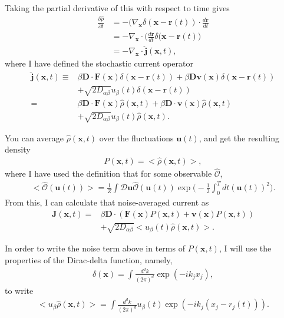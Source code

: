 \documentclass[twocolumn,amsmath,amssymb,aps]{revtex4-1}%
\begin{document}
Taking the partial derivative of this with respect to time gives
\begin{align}
  \frac{\partial\hat{\rho}}{\partial t}
  &=-(\nabla_{\bm{x}}\delta(\bm{x}-\bm{r}(t))
  \cdot\frac{d\bm{r}}{dt}\nonumber\\
  &=-\nabla_{\bm{x}}\cdot\bigg(\frac{d\bm{r}}{dt}
  \delta(\bm{x}-\bm{r}(t)\bigg)\nonumber\\
  &=-\nabla_{\bm{x}}\cdot\hat{\bm{j}}(\bm{x},t),
\end{align}
where I have defined the stochastic current operator
\begin{align}
  \hat{\bm{j}}(\bm{x},t)\equiv
  &\beta\bm{D}\cdot\bm{F}(\bm{x})\delta(\bm{x}-\bm{r}(t))
  +\beta\bm{D}\bm{v}(\bm{x})\delta(\bm{x}-\bm{r}(t))\nonumber\\
  &+\sqrt{2D_{\alpha\beta}}u_{\beta}(t)
  \delta(\bm{x}-\bm{r}(t))\nonumber\\
  =&\beta\bm{D}\cdot\bm{F}(\bm{x})\hat{\rho}(\bm{x},t)
  +\beta\bm{D}\cdot\bm{v}(\bm{x})\hat{\rho}(\bm{x},t)\nonumber\\
  &+\sqrt{2D_{\alpha\beta}}u_{\beta}(t)\hat{\rho}(\bm{x},t).
\end{align}

You can average $\hat{\rho}(\bm{x},t)$ over the fluctuations $\bm{u}(t)$, and
get the resulting density
\begin{align}
  P(\bm{x},t)=<\hat{\rho}(\bm{x},t)>,
\end{align}
where I have used the definition that for some observable $\hat{\mathcal{O}}$,
\begin{align}
  <\hat{\mathcal{O}}(\bm{u}(t))>=\frac{1}{Z}\int\mathcal{D}\bm{u}
  \hat{\mathcal{O}}(\bm{u}(t))
  \exp\bigg(-\frac{1}{2}\int_0^Tdt(\bm{u}(t))^2\bigg).
\end{align}
From this, I can calculate that noise-averaged current as
\begin{align}
  \bm{J}(\bm{x},t)=
  &\beta\bm{D}\cdot(\bm{F}(\bm{x})P(\bm{x},t)
  +\bm{v}(\bm{x})P(\bm{x},t))\nonumber\\
  &+\sqrt{2D_{\alpha\beta}}<u_{\beta}(t)\hat{\rho}(\bm{x},t)>.
\end{align}

In order to write the noise term above in terms of $P(\bm{x},t)$, I will use
the properties of the Dirac-delta function, namely,
\begin{align}
  \delta(\bm{x})=\int\frac{d^dk}{(2\pi)^d}\exp(-ik_jx_j),
\end{align}
to write
\begin{align}
  <u_{\beta}\hat{\rho}(\bm{x},t)>=\int\frac{d^dk}{(2\pi)^d}u_{\beta}(t)
  \exp(-ik_j(x_j-r_j(t))).
\end{align}
\end{document}
